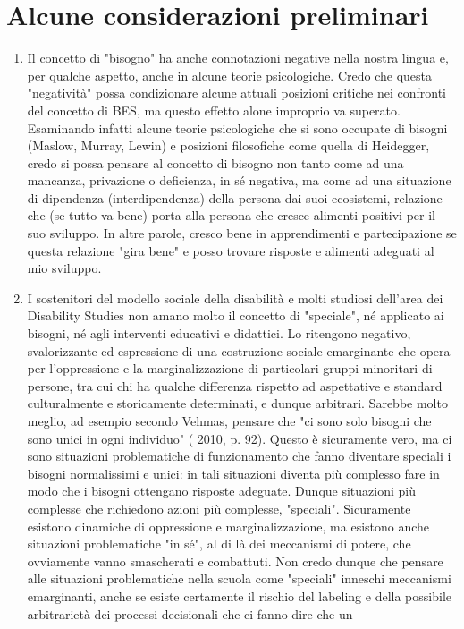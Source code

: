 \section*{Alcune considerazioni preliminari}
\begin{enumerate}
	\item Il concetto di "bisogno" ha anche connotazioni negative nella nostra lingua e, per qualche
	aspetto, anche in alcune teorie psicologiche. Credo che questa "negatività" possa condizionare
	alcune attuali posizioni critiche nei confronti del concetto di BES, ma questo effetto alone
	improprio va superato. Esaminando infatti alcune teorie psicologiche che si sono occupate di
	bisogni (Maslow, Murray, Lewin) e posizioni filosofiche come quella di Heidegger, credo si possa
	pensare al concetto di bisogno non tanto come ad una mancanza, privazione o deficienza, in sé
	negativa, ma come ad una situazione di dipendenza (interdipendenza) della persona dai suoi
	ecosistemi, relazione che (se tutto va bene) porta alla persona che cresce alimenti positivi per il
	suo sviluppo. In altre parole, cresco bene in apprendimenti e partecipazione se questa relazione
	"gira bene" e posso trovare risposte e alimenti adeguati al mio sviluppo.
	\item I sostenitori del modello sociale della disabilità e molti studiosi dell'area dei Disability
	Studies non amano molto il concetto di "speciale", né applicato ai bisogni, né agli interventi
	educativi e didattici. Lo ritengono negativo, svalorizzante ed espressione di una costruzione sociale
	emarginante che opera per l'oppressione e la marginalizzazione di particolari gruppi minoritari di
	persone, tra cui chi ha qualche differenza rispetto ad aspettative e standard culturalmente e
	storicamente determinati, e dunque arbitrari. Sarebbe molto meglio, ad esempio secondo Vehmas,
	pensare che "ci sono solo bisogni che sono unici in ogni individuo" ( 2010, p. 92). Questo è
	sicuramente vero, ma ci sono situazioni problematiche di funzionamento che fanno diventare
	speciali i bisogni normalissimi e unici: in tali situazioni diventa più complesso fare in modo che i
	bisogni ottengano risposte adeguate. Dunque situazioni più complesse che richiedono azioni più
	complesse, "speciali". Sicuramente esistono dinamiche di oppressione e marginalizzazione, ma
	esistono anche situazioni problematiche "in sé", al di là dei meccanismi di potere, che ovviamente
	vanno smascherati e combattuti. Non credo dunque che pensare alle situazioni problematiche
	nella scuola come "speciali" inneschi meccanismi emarginanti, anche se esiste certamente il rischio del labeling e della possibile arbitrarietà dei processi decisionali che ci fanno dire che un

\end{enumerate}
